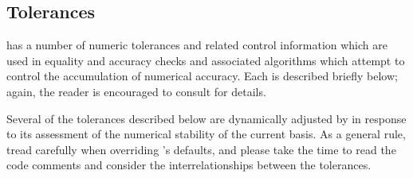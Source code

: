 \subsection{\dylp Tolerances}
\label{sec:DylpTolerances}

\dylp has a number of numeric tolerances and related control information
which are used in equality and accuracy checks and associated algorithms
which attempt to control the accumulation of numerical accuracy.
Each is described briefly below; again, the reader is encouraged to consult
 for details.

Several of the tolerances described below are dynamically adjusted by \dylp
in response to its assessment of the numerical stability of the current
basis.
As a general rule, tread carefully when overriding \dylp's defaults, and
please take the time to read the code comments and consider the
interrelationships between the tolerances.

